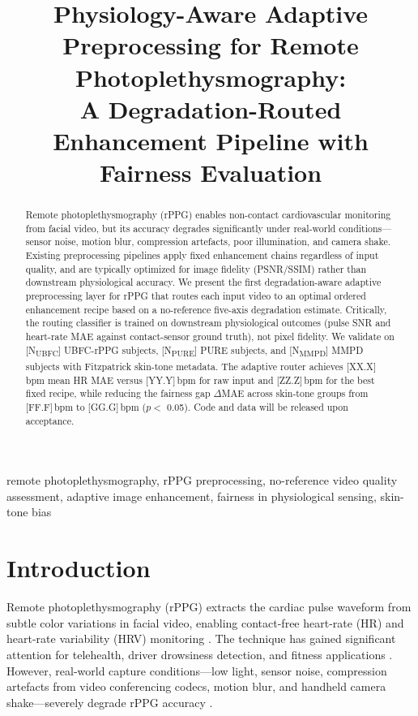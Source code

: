 \documentclass[conference]{IEEEtran}
\title{Physiology-Aware Adaptive Preprocessing for Remote Photoplethysmography: \\A Degradation-Routed Enhancement Pipeline with Fairness Evaluation}
\author{
\IEEEauthorblockN{Anonymous Authors}
\IEEEauthorblockA{\textit{Department of Electronics and Telecommunication Engineering} \\
\textit{NMIMS Mukesh Patel School of Technology Management and Engineering}\\
Mumbai, India \\
\{email@nmims.edu\}}
}
\begin{document}
\maketitle

\begin{abstract}
Remote photoplethysmography (rPPG) enables non-contact cardiovascular monitoring from facial video, but its accuracy degrades significantly under real-world conditions---sensor noise, motion blur, compression artefacts, poor illumination, and camera shake. Existing preprocessing pipelines apply fixed enhancement chains regardless of input quality, and are typically optimized for image fidelity (PSNR/SSIM) rather than downstream physiological accuracy. We present the first degradation-aware adaptive preprocessing layer for rPPG that routes each input video to an optimal ordered enhancement recipe based on a no-reference five-axis degradation estimate. Critically, the routing classifier is trained on downstream physiological outcomes (pulse SNR and heart-rate MAE against contact-sensor ground truth), not pixel fidelity. We validate on [N\textsubscript{UBFC}] UBFC-rPPG subjects, [N\textsubscript{PURE}] PURE subjects, and [N\textsubscript{MMPD}] MMPD subjects with Fitzpatrick skin-tone metadata. The adaptive router achieves [XX.X]\,bpm mean HR MAE versus [YY.Y]\,bpm for raw input and [ZZ.Z]\,bpm for the best fixed recipe, while reducing the fairness gap $\Delta$MAE across skin-tone groups from [FF.F]\,bpm to [GG.G]\,bpm ($p <$ 0.05). Code and data will be released upon acceptance.
\end{abstract}

\begin{IEEEkeywords}
remote photoplethysmography, rPPG preprocessing, no-reference video quality assessment, adaptive image enhancement, fairness in physiological sensing, skin-tone bias
\end{IEEEkeywords}

\section{Introduction}
\label{sec:intro}

Remote photoplethysmography (rPPG) extracts the cardiac pulse waveform from subtle color variations in facial video, enabling contact-free heart-rate (HR) and heart-rate variability (HRV) monitoring \cite{verkruysse2008remote,de2013robust}. The technique has gained significant attention for telehealth, driver drowsiness detection, and fitness applications \cite{nowara2020meta}. However, real-world capture conditions---low light, sensor noise, compression artefacts from video conferencing codecs, motion blur, and handheld camera shake---severely degrade rPPG accuracy \cite{wang2016algorithmic}.
\end{document}
